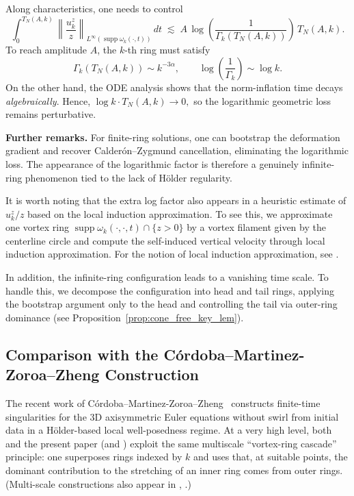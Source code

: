 \documentclass[reqno,11pt]{amsart}
\newcommand{\supp}{\operatorname{supp}}
\begin{document}
Along characteristics, one needs to control
\[
\int_0^{T_N(A,k)} 
\left\| \frac{u^{z}_{k}}{z} \right\|_{L^\infty(\supp \omega_k(\cdot,t))}
\,dt
\;\lesssim\;
A\,
\log\!\left(\frac{1}{\Gamma_k(T_N(A,k))}\right)
\, T_N(A,k).
\]
To reach amplitude $A$, the $k$-th ring must satisfy
\[
\Gamma_k(T_N(A,k)) \sim k^{-3\alpha},
\qquad
\log\!\left(\frac{1}{\Gamma_k}\right) \sim \log k.
\]
On the other hand, the ODE analysis shows that the norm-inflation time decays \emph{algebraically}.
Hence, $\log k \cdot T_N(A,k) \to 0,$ so the logarithmic geometric loss remains perturbative.

\medskip

\noindent
\textbf{Further remarks.}
For finite-ring solutions, one can bootstrap the deformation gradient and recover Calderón--Zygmund cancellation, eliminating the logarithmic loss. The appearance of the logarithmic factor is therefore a genuinely infinite-ring phenomenon tied to the lack of Hölder regularity.

It is  worth noting that the extra log factor also appears in a heuristic estimate of $u_k^{z}/z$ based on the local induction approximation.
To see this, we approximate one vortex ring $\supp \omega_k(\cdot,\cdot,t)\cap \{z>0\}$ by a vortex filament given by the centerline circle and compute the self-induced vertical velocity  through local induction approximation. For the notion of local induction approximation, see \cite[Chapter 7]{MajdaBertozzi01}.

In addition, the infinite-ring configuration leads to a vanishing time scale. To handle this, we decompose the configuration into head and tail rings, applying the bootstrap argument only to the head and controlling the tail via outer-ring dominance (see  Proposition~\ref{prop:cone_free_key_lem}).



\subsection{Comparison with the C\'ordoba--Martinez-Zoroa--Zheng Construction}
\label{subsec:CMZ_comparison}
The recent work of C\'ordoba--Martinez-Zoroa--Zheng \,\cite{CordobaMartinezZheng25} constructs finite-time
singularities for the $3$D axisymmetric Euler equations without swirl from initial data in a
H\"older-based local well-posedness regime.
At a very high level, both \,\cite{CordobaMartinezZheng25} and the present paper (and \cite{KimJeong22}) exploit the same multiscale
``vortex-ring cascade'' principle: one superposes rings indexed by $k$ and uses that, at suitable
points, the dominant contribution to the stretching of an inner ring comes from outer rings. 
(Multi-scale constructions also appear in \cite{CordobaMartinezZoroa23ForcedEuler}, \cite{CordobaLainSanclementeMartinezZoroa25}.)
\end{document}
